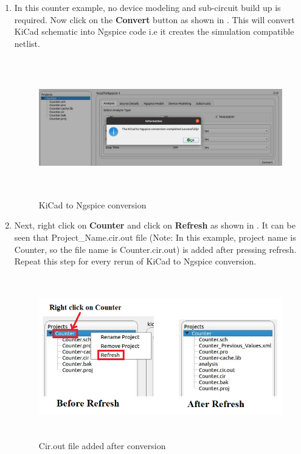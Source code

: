 \begin{enumerate}
\item In this counter example, no device modeling and sub-circuit build up is required. Now click on the \textbf{Convert} button as shown in . This will convert KiCad schematic into Ngspice code i.e it creates the simulation compatible netlist.

\begin{figure}[H]
\centering
\includegraphics[width = 14cm, height =6cm]{./NgVeri/KiCadconv.png}
\caption{KiCad to Ngspice conversion}
\label{KiCadconv}
\end{figure}

\item Next, right click on \textbf{Counter} and click on \textbf{Refresh} as shown in . It can be seen that Project\_Name.cir.out file (Note: In this example, project name is Counter, so the file name is Counter.cir.out) is added after pressing refresh. Repeat this step for every rerun of KiCad to Ngspice conversion. 

\begin{figure}[H]
\centering
\includegraphics[width = 14cm, height =7cm]{./NgVeri/refreshbefore.png}
\caption{Cir.out file added after conversion}
\label{refresh}
\end{figure}


\end{enumerate}
